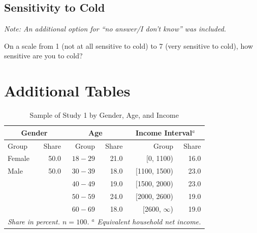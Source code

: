 \documentclass[egregdoesnotlikesansseriftitles]{scrartcl}
\begin{document}
\subsection*{Sensitivity to Cold}
\noindent\textit{Note: An additional option for ``no answer/I don't know'' was included.}\vspace{1ex}

\noindent On a scale from 1 (not at all sensitive to cold) to 7 (very sensitive to cold), how sensitive are you to cold? %


\clearpage
\section{Additional Tables}\label{sec:app_additional_tables}

\begin{table}[ht!]
\center
\caption{Sample of Study 1 by Gender, Age, and Income}
\label{tab:quota_study_1}
\begin{tabular}{lrrrrr}\\[0.5ex]
   \hline
   \multicolumn{2}{c}{Gender}   & \multicolumn{2}{c}{Age}   & \multicolumn{2}{c}{Income Interval$^a$}   \\
   \hline
   Group    & Share             & Group	    & Share         & Group              & Share                \\
   \hline\hline
   Female   & 50.0              & $18-29$   & 21.0          &    [0, 1100)       & 16.0                 \\
   Male     & 50.0              & $30-39$   & 18.0          & [1100, 1500)       & 23.0                 \\
   	        &                   & $40-49$   & 19.0          & [1500, 2000)       & 23.0                 \\
   	        &                   & $50-59$   & 24.0          & [2000, 2600)       & 19.0                 \\
   	        &                   & $60-69$   & 18.0          & [2600, $\infty$)   & 19.0                 \\
   \hline
   \multicolumn{6}{p{9cm}}{\footnotesize{\textit{Share in percent. $n = 100$. $^a$ Equivalent household net income.}}}
\end{tabular}
\end{table}
\end{document}
